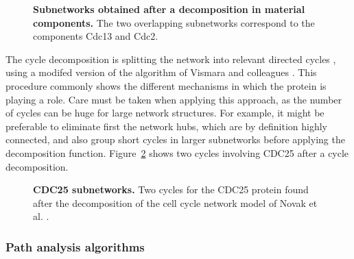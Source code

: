 \documentclass[10pt]{bmc_article}
\newenvironment{bmcformat}{\baselineskip20pt\sloppy\setboolean{publ}{false}}{\baselineskip20pt\sloppy}
\begin{document}
\begin{bmcformat}
\begin{figure}[h]
 \caption{\label{matcdc2cdc13}  \textbf{Subnetworks obtained after a decomposition in
material components.} The two overlapping subnetworks correspond to the components Cdc13 and
Cdc2.}
\end{figure}


The cycle decomposition is splitting the network into relevant directed cycles
\cite{gleiss2001relevant}, using a modifed version of the algorithm of Vismara
and colleagues \cite{vismara1997union}. This procedure commonly shows the
different mechanisms in which the protein is playing a role. Care must
be taken when applying this approach, as the number of cycles can be huge for
large network structures. For example, it might be preferable to eliminate first
the network hubs, which are by definition highly connected, and also group short
cycles in larger subnetworks before applying the decomposition function.
Figure~\ref{mphasecdc25cycles} shows two
cycles involving CDC25 after a cycle decomposition.

\begin{figure}[h]
 \caption{\label{mphasecdc25cycles}  \textbf{CDC25 subnetworks.}
      Two cycles for the CDC25 protein found after the decomposition of the cell cycle network model of Novak et al. \cite{novak1998model}.}
\end{figure}

\subsubsection*{Path analysis algorithms}


\end{bmcformat}
\end{document}
